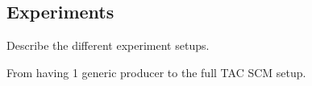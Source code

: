 \subsection{Experiments}

Describe the different experiment setups.

From having 1 generic producer to the full TAC SCM setup.
